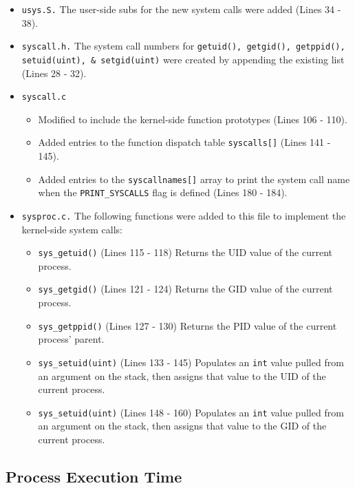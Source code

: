 \documentclass[11pt,letterpaper]{report}
\begin{document}
\begin{itemize}
	\item {\tt usys.S.} The user-side subs for the new system calls were added ({\color{red}Lines 34 - 38}).
	
	\item {\tt syscall.h.} The system call numbers for {\tt getuid(), getgid(), getppid(), setuid(uint), \& setgid(uint)} were created by appending the existing list ({\color{red}Lines 28 - 32}).
	
	\item {\tt syscall.c}
		\begin{itemize}
			\item Modified to include the kernel-side function prototypes ({\color{red}Lines 106 - 110}).
			\item Added entries to the function dispatch table {\tt syscalls[]} ({\color{red}Lines 141 - 145}).
			\item Added entries to the {\tt syscallnames[]} array to print the system call name when the {\tt PRINT\_SYSCALLS} flag is defined ({\color{red}Lines 180 - 184}).
		\end{itemize}
	
	\item {\tt sysproc.c.} The following functions were added to this file to implement the kernel-side system calls:
		\begin{itemize}
			\item {\tt sys\_getuid()} ({\color{red}Lines 115 - 118}) Returns the UID value of the current process.
			\item {\tt sys\_getgid()} ({\color{red}Lines 121 - 124}) Returns the GID value of the current process.
			\item {\tt sys\_getppid()} ({\color{red}Lines 127 - 130}) Returns the PID value of the current process' parent.
			\item {\tt sys\_setuid(uint)} ({\color{red}Lines 133 - 145}) Populates an {\tt int} value pulled from an argument on the stack, then assigns that value to the UID of the current process.
			\item {\tt sys\_setuid(uint)} ({\color{red}Lines 148 - 160}) Populates an {\tt int} value pulled from an argument on the stack, then assigns that value to the GID of the current process.
		\end{itemize}
			
	\end{itemize}
\newpage
	\subsection*{Process Execution Time}
	
\end{document}
